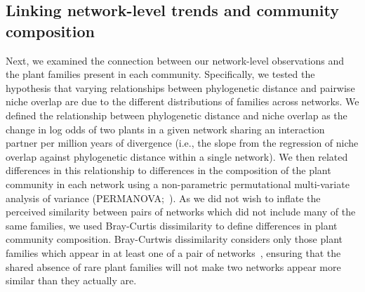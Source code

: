 \documentclass[12pt]{article}
\begin{document}
\begin{spacing}{1.5}



\subsection*{Linking network-level trends and community composition}

  Next, we examined the connection between our network-level observations
  and the plant families present in each community.
  Specifically, we tested the hypothesis that
  varying relationships between phylogenetic distance and
  pairwise niche overlap are due to the different distributions 
  of families across networks. We defined the relationship between
  phylogenetic distance and niche overlap as the change in 
  log odds of two plants in a given network sharing an interaction 
  partner per million years of divergence (i.e., the slope from the 
  regression of niche overlap against phylogenetic distance within
  a single network). We then related differences in this relationship
  to differences in the composition of the plant community in each
  network using a non-parametric permutational multi-variate 
  analysis of variance (PERMANOVA;~\citealp{Anderson2001}).
  As we did not wish to inflate the perceived similarity between
  pairs of networks which did not include many of the same families,
  we used Bray-Curtis dissimilarity to define differences in plant
  community composition. Bray-Curtwis dissimilarity considers only
  those plant families which appear in at least one of a pair of
  networks~\citep{Anderson2001,Cirtwill2015}, ensuring that the
  shared absence of rare plant families will not make 
  two networks appear more similar than they actually are. 



\end{spacing}
\end{document}
